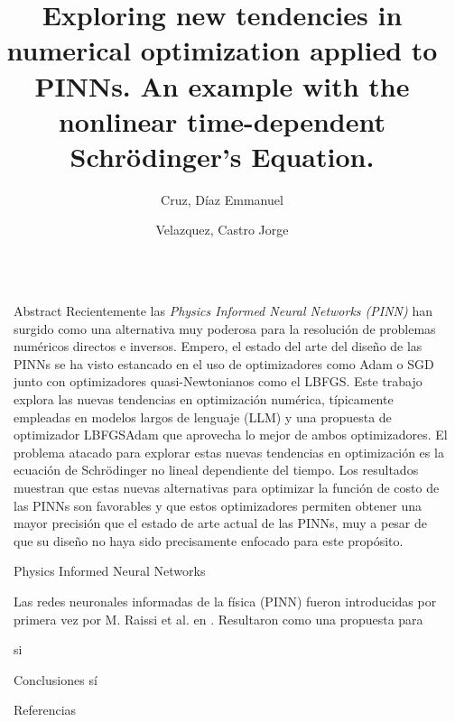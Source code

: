 \documentclass[final]{beamer}
\title{Exploring new tendencies in numerical optimization applied to PINNs. An example with the nonlinear time-dependent Schrödinger's Equation.}
\author{Cruz, Díaz Emmanuel \inst{1} \and Velazquez, Castro Jorge \inst{2}}
\institute[shortinst]{\inst{1,}\inst{2} Facultad de Ciencias Físico Matemáticas, Benemérita Universidad Autónoma de Puebla \samelineand}
\newlength{\sepwidth}
\newlength{\colwidth}
\newcommand{\separatorcolumn}{\begin{column}{\sepwidth}\end{column}}
\begin{document}
\begin{frame}[t]
\begin{columns}[t]
\separatorcolumn

\begin{column}{\colwidth}

  \begin{block}{Abstract}
    Recientemente las \textit{Physics Informed Neural Networks (PINN)} han surgido como una alternativa muy poderosa
    para la resolución de problemas numéricos directos e inversos. Empero, el estado del arte del diseño de las PINNs se ha visto
    estancado en el uso de optimizadores como Adam o SGD junto con optimizadores quasi-Newtonianos como el LBFGS. Este trabajo
    explora las nuevas tendencias en optimización numérica, típicamente empleadas en modelos largos de lenguaje (LLM) y una 
    propuesta de optimizador LBFGSAdam que aprovecha lo mejor de ambos optimizadores. El problema atacado para explorar estas nuevas
    tendencias en optimización es la ecuación de Schrödinger no lineal dependiente del tiempo. Los resultados muestran que estas nuevas
    alternativas para optimizar la función de costo de las PINNs son favorables y que estos optimizadores permiten obtener una mayor precisión
    que el estado de arte actual de las PINNs, muy a pesar de que su diseño no haya sido precisamente enfocado para este propósito.     
  \end{block}
  
  \begin{block}{Physics Informed Neural Networks}

    Las redes neuronales informadas de la física (PINN) fueron introducidas por primera vez por M. Raissi et al. en \cite{Raissi2019}. 
    Resultaron como una propuesta para 

    si
  \end{block}



   \begin{block}{Conclusiones}
    sí
  \end{block}


  \begin{block}{Referencias}


\end{block}
\end{column}
\end{columns}
\end{frame}
\end{document}
